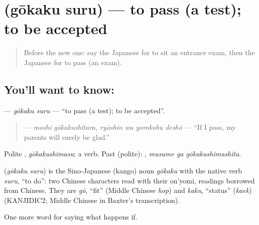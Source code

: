 \section[\texorpdfstring{\ja{ごうかくする} (gōkaku suru)}{ごうかくする (gōkaku suru)}]{ (gōkaku suru) — to pass (a test); to be accepted}

\label{lesson:JA-C515-goukaku-suru}



\begin{quote}
Before the new one: say the Japanese for to sit an entrance exam, then the Japanese for to pass (an exam).
\end{quote}

\subsection*{You'll want to know: }
\textbf{} — \emph{gōkaku suru} — \textquotedblleft{}to pass (a test); to be accepted\textquotedblright{}.

\begin{quote}
\textbf{  } — \emph{moshi gōkakushitara, ryōshin wa yorokobu deshō} — \textquotedblleft{}If I pass, my parents will surely be glad.\textquotedblright{}
\end{quote}

Polite \textbf{}, \emph{gōkakushimasu}; a  verb. Past (polite): \textbf{ }, \emph{musume ga gōkakushimashita}.

\begin{cousinweb}
\textbf{} (\emph{gōkaku suru}) is the Sino-Japanese (kango) noun \emph{gōkaku} with the native verb \emph{suru}, \textquotedblleft{}to do\textquotedblright{}: two Chinese characters read with their on'yomi, readings borrowed from Chinese. They are \emph{gō}, \textquotedblleft{}fit\textquotedblright{} (Middle Chinese \emph{hop}) and \emph{kaku}, \textquotedblleft{}status\textquotedblright{} (\emph{kaek}) (KANJIDIC2; Middle Chinese in Baxter's transcription).
\end{cousinweb}

\begin{grammarlens}[title={What you've built}]
One more word for saying what happens if.
\end{grammarlens}

